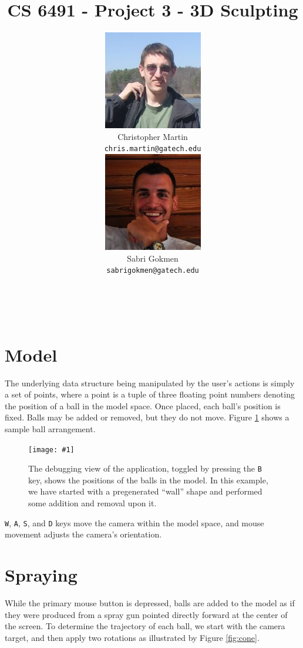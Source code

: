 \documentclass{article}
\title{\vspace{-60pt}CS 6491 - Project 3 - 3D Sculpting}
\author{
\begin{tabular}{rr}
&\multirow{3}{*}{\includegraphics[scale=0.4]{chris.jpg}}\\
Christopher Martin\\
\texttt{chris.martin@gatech.edu}&
\end{tabular}
\begin{tabular}{ll}
\multirow{3}{*}{\includegraphics[scale=0.4]{sabri.jpg}}\\&
Sabri Gokmen\\&\texttt{sabrigokmen@gatech.edu}\end{tabular}
~\\~\\~\\}
\newcommand\screenshot[1]{\texttt{[image: \#1]}}
\begin{document}
\makeatletter
{}
\makeatother

\section{Model}

The underlying data structure being manipulated by the user's
actions is simply a set of points, where a point is a tuple of
three floating point numbers denoting the position of a ball
in the model space.
Once placed, each ball's position is fixed.
Balls may be added or removed, but they do not move.
Figure \ref{fig:balls} shows a sample ball arrangement.

\begin{figure}[h!]
\centering
\screenshot{balls}
\caption{The debugging view of the application,
toggled by pressing the \texttt{B} key, shows the
positions of the balls in the model.
In this example, we have started with a pregenerated
``wall'' shape and performed some addition and removal
upon it.}
\label{fig:balls}
\end{figure}

\texttt{W}, \texttt{A}, \texttt{S}, and \texttt{D} keys
move the camera within the model space, and mouse
movement adjusts the camera's orientation.

\section{Spraying}

While the primary mouse button is depressed, balls
are added to the model as if they were produced from
a spray gun pointed directly forward at the center
of the screen.
To determine the trajectory of each ball, we start
with the camera target, and then apply two rotations
as illustrated by Figure \ref{fig:cone}.
\end{document}
